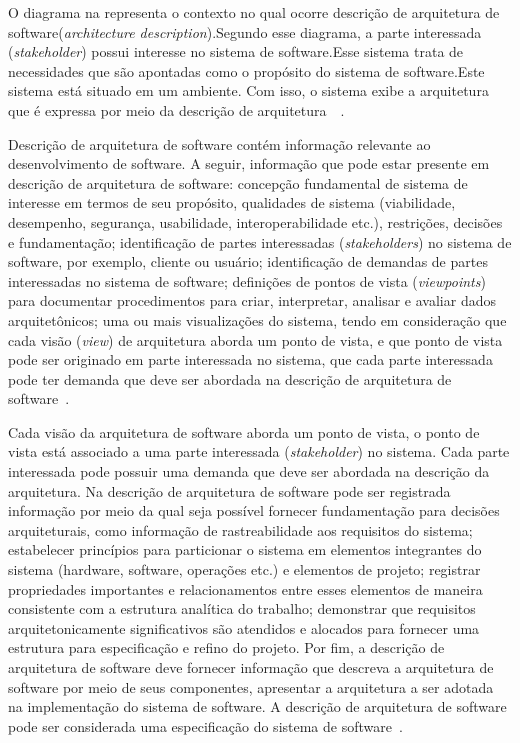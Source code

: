 %

O diagrama na  representa o contexto no qual ocorre descrição de arquitetura de software(\emph{architecture description}).Segundo esse diagrama, a parte interessada (\emph{stakeholder}) possui interesse no sistema de software.Esse sistema trata de necessidades que são apontadas como o propósito do sistema de software.Este sistema está situado em um ambiente. Com isso, o sistema exibe a arquitetura que é expressa por meio da descrição de arquitetura~\cite{ISO_1471}~\cite{ISO_42010}. 

Descrição de arquitetura de software contém informação relevante ao desenvolvimento de software. A seguir, informação que pode estar presente em descrição de arquitetura de software: concepção fundamental de sistema de interesse em termos de seu propósito, qualidades de sistema (viabilidade, desempenho, segurança, usabilidade, interoperabilidade etc.), restrições, decisões e fundamentação; identificação de partes interessadas (\emph{stakeholders}) no sistema de software, por exemplo, cliente ou usuário; identificação de demandas de partes interessadas no sistema de software; definições de pontos de vista (\emph{viewpoints}) para documentar procedimentos para criar, interpretar, analisar e avaliar dados arquitetônicos; uma ou mais visualizações do sistema, tendo em consideração que cada visão (\emph{view}) de arquitetura aborda um ponto de vista, e que ponto de vista pode ser originado em parte interessada no sistema, que cada parte interessada pode ter demanda que deve ser abordada na descrição de arquitetura de software~\cite{ISO_15289}. 

Cada visão da arquitetura de software aborda um ponto de vista, o ponto de vista está associado a uma parte interessada (\emph{stakeholder}) no sistema. Cada parte interessada pode possuir uma demanda que deve ser abordada na descrição da arquitetura. Na descrição de arquitetura de software pode ser registrada informação por meio da qual seja possível fornecer fundamentação para decisões arquiteturais, como informação de rastreabilidade aos requisitos do sistema; estabelecer princípios para particionar o sistema em elementos integrantes do sistema (hardware, software, operações etc.) e elementos de projeto; registrar propriedades importantes e relacionamentos entre esses elementos de maneira consistente com a estrutura analítica do trabalho; demonstrar que requisitos arquitetonicamente significativos são atendidos e alocados para fornecer uma estrutura para especificação e refino do projeto. Por fim, a descrição de arquitetura de software deve fornecer informação que descreva a arquitetura de software por meio de seus componentes, apresentar a arquitetura a ser adotada na implementação do sistema de software. A descrição de arquitetura de software pode ser considerada uma especificação do sistema de software~\cite{ISO_15289}. 

